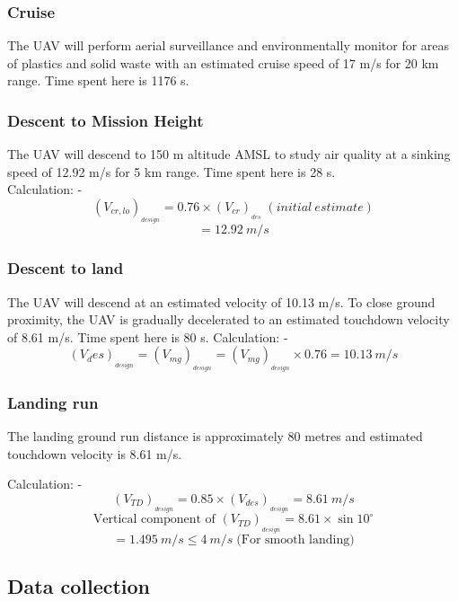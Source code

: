 \documentclass[12 pt]{article}
\begin{document}
\subsubsection{Cruise \cite{alhajjaji2017design}}
The UAV will perform aerial surveillance and environmentally monitor for areas of plastics and solid waste with an estimated cruise speed of 17 m/s for 20 km range. Time spent here is 1176 s.

\subsubsection{Descent to Mission Height}
The UAV will descend to 150 m altitude AMSL to study air quality at a sinking speed of 12.92 m/s for 5 km range. Time spent here is 28 s.\\

Calculation: - 
$$ (V_{cr,lo})_{_{design}} = 0.76 \times (V_{cr})_{_{des}} \;  (initial \: estimate) $$
$$ = 12.92 \: m/s $$

\subsubsection{Descent to land \cite{Anderson1}}
The UAV will descend at an estimated velocity of 10.13 m/s. To close ground proximity, the UAV is gradually decelerated to an estimated touchdown velocity of 8.61 m/s. Time spent here is 80 s.
Calculation: - 
$$(V_des)_{_{design}} = (V_{mg})_{_{design}} = (V_{mg})_{_{design}} \times 0.76 = 10.13 \: m/s $$

\subsubsection{Landing run}
The landing ground run distance is approximately 80 metres and estimated touchdown velocity is 8.61 m/s.

Calculation: - 
$$ (V_{TD})_{_{design}} = 0.85 \times (V_{des})_{_{design}} = 8.61 \: m/s  $$
$$ \text{Vertical component of } (V_{TD})_{_{design}} = 8.61 \times \sin{10^{\circ}} $$
$$ = 1.495 \: m/s \leq 4 \: m/s \; \text{(For smooth landing)} $$



\subsection{Data collection}
\end{document}
